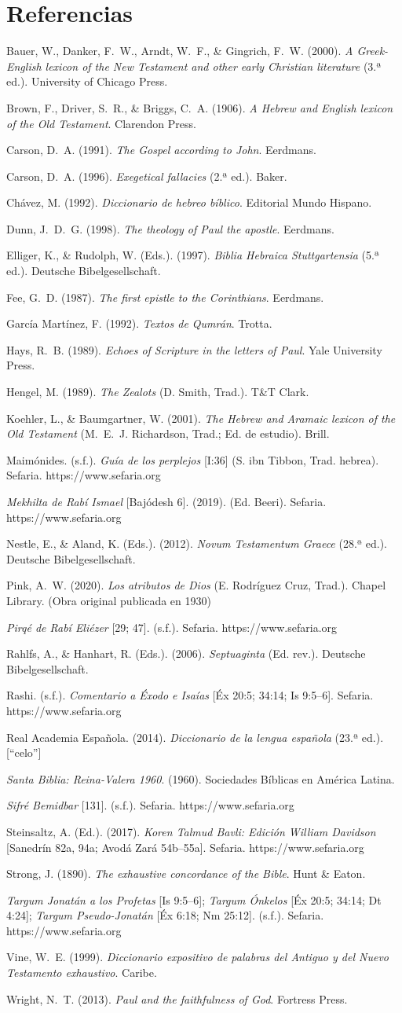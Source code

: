 \documentclass[11pt,letterpaper]{article}
\newcommand{\refapa}[1]{\par{\RaggedRight\hangindent=1.27cm\hangafter=1\noindent #1\par}\vspace{4pt}}
\begin{document}
\section*{Referencias}
\refapa{Bauer, W., Danker, F.~W., Arndt, W.~F., \& Gingrich, F.~W. (2000). \emph{A Greek-English lexicon of the New Testament and other early Christian literature} (3.ª ed.). University of Chicago Press.}
\refapa{Brown, F., Driver, S.~R., \& Briggs, C.~A. (1906). \emph{A Hebrew and English lexicon of the Old Testament}. Clarendon Press.}
\refapa{Carson, D.~A. (1991). \emph{The Gospel according to John}. Eerdmans.}
\refapa{Carson, D.~A. (1996). \emph{Exegetical fallacies} (2.ª ed.). Baker.}
\refapa{Chávez, M. (1992). \emph{Diccionario de hebreo bíblico}. Editorial Mundo Hispano.}
\refapa{Dunn, J.~D.~G. (1998). \emph{The theology of Paul the apostle}. Eerdmans.}
\refapa{Elliger, K., \& Rudolph, W. (Eds.). (1997). \emph{Biblia Hebraica Stuttgartensia} (5.ª ed.). Deutsche Bibelgesellschaft.}
\refapa{Fee, G.~D. (1987). \emph{The first epistle to the Corinthians}. Eerdmans.}
\refapa{García Martínez, F. (1992). \emph{Textos de Qumrán}. Trotta.}
\refapa{Hays, R.~B. (1989). \emph{Echoes of Scripture in the letters of Paul}. Yale University Press.}
\refapa{Hengel, M. (1989). \emph{The Zealots} (D. Smith, Trad.). T\&T Clark.}
\refapa{Koehler, L., \& Baumgartner, W. (2001). \emph{The Hebrew and Aramaic lexicon of the Old Testament} (M.~E.~J. Richardson, Trad.; Ed. de estudio). Brill.}
\refapa{Maimónides. (s.f.). \emph{Guía de los perplejos} [I:36] (S. ibn Tibbon, Trad. hebrea). Sefaria. https://www.sefaria.org}
\refapa{\emph{Mekhilta de Rabí Ismael} [Bajódesh 6]. (2019). (Ed. Beeri). Sefaria. https://www.sefaria.org}
\refapa{Nestle, E., \& Aland, K. (Eds.). (2012). \emph{Novum Testamentum Graece} (28.ª ed.). Deutsche Bibelgesellschaft.}
\refapa{Pink, A.~W. (2020). \emph{Los atributos de Dios} (E. Rodríguez Cruz, Trad.). Chapel Library. (Obra original publicada en 1930)}
\refapa{\emph{Pirqé de Rabí Eliézer} [29; 47]. (s.f.). Sefaria. https://www.sefaria.org}
\refapa{Rahlfs, A., \& Hanhart, R. (Eds.). (2006). \emph{Septuaginta} (Ed. rev.). Deutsche Bibelgesellschaft.}
\refapa{Rashi. (s.f.). \emph{Comentario a Éxodo e Isaías} [Éx 20:5; 34:14; Is 9:5--6]. Sefaria. https://www.sefaria.org}
\refapa{Real Academia Española. (2014). \emph{Diccionario de la lengua española} (23.ª ed.). [``celo'']}
\refapa{\emph{Santa Biblia: Reina-Valera 1960}. (1960). Sociedades Bíblicas en América Latina.}
\refapa{\emph{Sifré Bemidbar} [131]. (s.f.). Sefaria. https://www.sefaria.org}
\refapa{Steinsaltz, A. (Ed.). (2017). \emph{Koren Talmud Bavli: Edición William Davidson} [Sanedrín 82a, 94a; Avodá Zará 54b--55a]. Sefaria. https://www.sefaria.org}
\refapa{Strong, J. (1890). \emph{The exhaustive concordance of the Bible}. Hunt \& Eaton.}
\refapa{\emph{Targum Jonatán a los Profetas} [Is 9:5--6]; \emph{Targum Ónkelos} [Éx 20:5; 34:14; Dt 4:24]; \emph{Targum Pseudo-Jonatán} [Éx 6:18; Nm 25:12]. (s.f.). Sefaria. https://www.sefaria.org}
\refapa{Vine, W.~E. (1999). \emph{Diccionario expositivo de palabras del Antiguo y del Nuevo Testamento exhaustivo}. Caribe.}
\refapa{Wright, N.~T. (2013). \emph{Paul and the faithfulness of God}. Fortress Press.}
\end{document}
